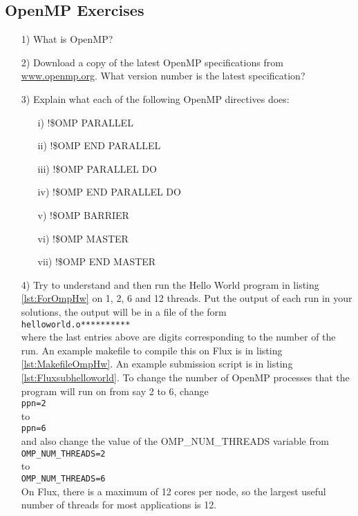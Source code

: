 \subsection{OpenMP Exercises}
\begin{enumerate}
\item[1)] What is OpenMP?
\item[2)] Download a copy of the latest OpenMP specifications from \url{www.openmp.org}. What version number is the latest specification?
\item[3)] Explain what each of the following OpenMP directives does:
\begin{enumerate}
\item[i)] !\$OMP PARALLEL
\item[ii)] !\$OMP END PARALLEL
\item[iii)] !\$OMP PARALLEL DO
\item[iv)] !\$OMP END PARALLEL DO
\item[v)] !\$OMP BARRIER
\item[vi)] !\$OMP MASTER
\item[vii)] !\$OMP END MASTER
\end{enumerate}
\item[4)] Try to understand and then run the Hello World program in listing \ref{lst:ForOmpHw}  on 1, 2, 6 and 12 threads. Put the output of each run in your solutions, the output will be in a file of the form\\ 
\texttt{helloworld.o**********}\\
where the last entries above are digits corresponding to the number of the run. An example makefile to compile this on Flux is in listing \ref{lst:MakefileOmpHw}. An example submission script is in listing \ref{lst:Fluxsubhelloworld}. To change the number of OpenMP processes that the program will run on from say 2 to 6,  change \\
\texttt{ppn=2}\\ 
to\\ 
\texttt{ppn=6}\\
and also change the value of the OMP\_NUM\_THREADS variable from\\
\texttt{OMP\_NUM\_THREADS=2}\\
to \\
\texttt{OMP\_NUM\_THREADS=6}\\
On Flux, there is a maximum of 12 cores per node, so the largest useful number of threads for most applications is 12.




\end{enumerate}
